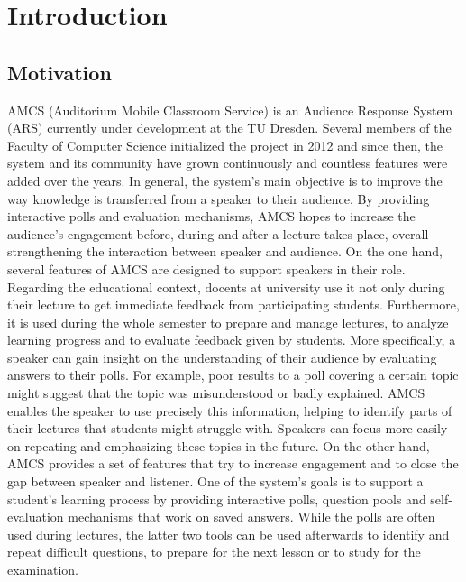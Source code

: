 
\chapter{Introduction}

\section{Motivation}


AMCS (Auditorium Mobile Classroom Service) is an Audience Response System (ARS) currently under development at the TU Dresden. Several members of the Faculty of Computer Science initialized the project in 2012 and since then, the system and its community have grown continuously and countless features were added over the years.
\newline
\newline
In general, the system's main objective is to improve the way knowledge is transferred from a speaker to their audience. By providing interactive polls and evaluation mechanisms, AMCS hopes to increase the audience's engagement before, during and after a lecture takes place, overall strengthening the interaction between speaker and audience.
\newline
\newline
On the one hand, several features of AMCS are designed to support speakers in their role. Regarding the educational context, docents at university use it not only during their lecture to get immediate feedback from participating students. Furthermore, it is used during the whole semester to prepare and manage lectures, to analyze learning progress and to evaluate feedback given by students. More specifically, a speaker can gain insight on the understanding of their audience by evaluating answers to their polls. For example, poor results to a poll covering a certain topic might suggest that the topic was misunderstood or badly explained. AMCS enables the speaker to use precisely this information, helping to identify parts of their lectures that students might struggle with. Speakers can focus more easily on repeating and emphasizing these topics in the future.
\newline
\newline
On the other hand, AMCS provides a set of features that try to increase engagement and to close the gap between speaker and listener.
One of the system's goals is to support a student's learning process by providing interactive polls, question pools and self-evaluation mechanisms that work on saved answers. While the polls are often used during lectures, the latter two tools can be used afterwards to identify and repeat difficult questions, to prepare for the next lesson or to study for the examination. 
